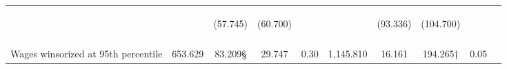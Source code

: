 \begin{tabular}{lccccccccc}
 & \begin{footnotesize}\end{footnotesize} & \begin{footnotesize}(57.745)\end{footnotesize} & \begin{footnotesize}(60.700)\end{footnotesize} & \begin{footnotesize}\end{footnotesize} & \begin{footnotesize}\end{footnotesize} & \begin{footnotesize}(93.336)\end{footnotesize} & \begin{footnotesize}(104.700)\end{footnotesize} & \begin{footnotesize}\end{footnotesize} & \begin{footnotesize}\end{footnotesize}\\
 & \begin{footnotesize}\end{footnotesize} & \begin{footnotesize}[0.295]\end{footnotesize} & \begin{footnotesize}[1.000]\end{footnotesize} & \begin{footnotesize}\end{footnotesize} & \begin{footnotesize}\end{footnotesize} & \begin{footnotesize}[1.000]\end{footnotesize} & \begin{footnotesize}[0.025]\end{footnotesize} & \begin{footnotesize}\end{footnotesize} & \begin{footnotesize}\end{footnotesize}\\
\noalign{\smallskip}Wages winsorized at 95th percentile & 653.629 & 83.209§ & 29.747 & 0.30 & 1,145.810 & 16.161 & 194.265† & 0.05 & \\

\end{tabular}

